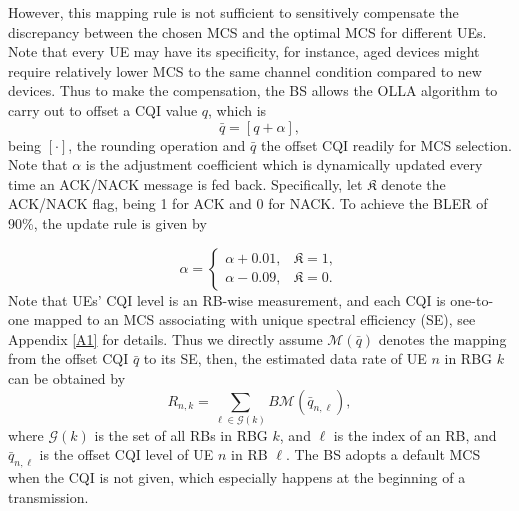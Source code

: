 \documentclass[conference,compsocconf]{IEEEtran}
\begin{document}
However, this mapping rule is not sufficient to sensitively compensate the discrepancy between the chosen MCS and the optimal MCS for different UEs. Note that every UE may have its specificity, for instance, aged devices might require relatively lower MCS to the same channel condition compared to new devices. Thus to make the compensation, the BS allows the OLLA algorithm to carry out to offset a CQI value $q$, which is
\begin{equation}
\bar{q}=\left[q+\alpha\right],
\end{equation}
being $[\cdot]$, the rounding operation and $\bar{q}$ the offset CQI readily for MCS selection. Note that $\alpha$ is the adjustment coefficient which is dynamically updated every time an ACK/NACK message is fed back. Specifically, let $\mathfrak{K}$ denote the ACK/NACK flag, being 1 for ACK and 0 for NACK. To achieve the BLER of 90\%, the update rule is given by 

\begin{equation}
\alpha=
\begin{cases}
\alpha+0.01, & \mathfrak{K} = 1, \\
\alpha-0.09, & \mathfrak{K} = 0.
\end{cases}
\end{equation}
Note that UEs' CQI level is an RB-wise measurement, and each CQI is one-to-one mapped to an MCS associating with unique spectral efficiency (SE), see Appendix \ref{A1} for details. Thus we directly assume $\mathcal{M}(\bar{q})$ denotes the mapping from the offset CQI $\bar{q}$ to its SE, then, the estimated data rate of UE $n$ in RBG $k$ can be obtained by
\begin{equation}
R_{n,k}=\sum_{\ell\in \mathcal{G}(k)} B\mathcal{M}(\bar{q}_{n,\ell}),
\end{equation}
where $\mathcal{G}(k)$ is the set of all RBs in RBG $k$, and $\ell$ is the index of an RB, and $\bar{q}_{n,\ell}$ is the offset CQI level of UE $n$ in RB $\ell$. The BS adopts a default MCS when the CQI is not given, which especially happens at the beginning of a transmission. 
\end{document}
